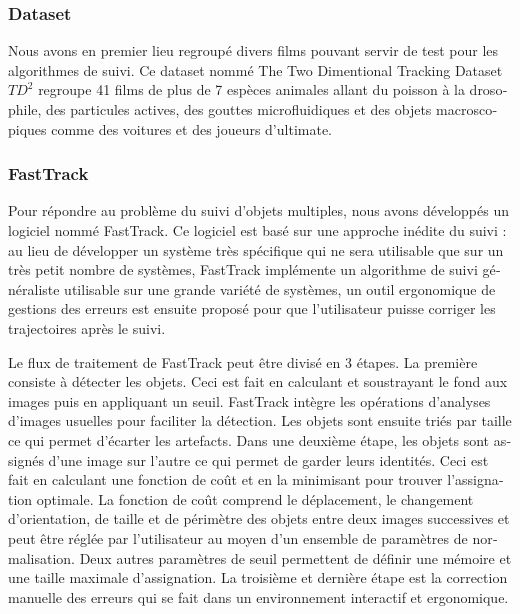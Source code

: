 \begin{otherlanguage}{french}
\subsubsection*{Dataset}
Nous avons en premier lieu regroupé divers films pouvant servir de test pour les algorithmes de suivi. Ce dataset nommé The Two Dimentional Tracking Dataset $TD^2$ regroupe 41 films de plus de 7 espèces animales allant du poisson à la drosophile, des particules actives, des gouttes microfluidiques et des objets macroscopiques comme des voitures et des joueurs d'ultimate.

\subsubsection*{FastTrack}
Pour répondre au problème du suivi d'objets multiples, nous avons développés un logiciel nommé FastTrack. Ce logiciel est basé sur une approche inédite du suivi : au lieu de développer un système très spécifique qui ne sera utilisable que sur un très petit nombre de systèmes, FastTrack implémente un algorithme de suivi généraliste utilisable sur une grande variété de systèmes, un outil ergonomique de gestions des erreurs est ensuite proposé pour que l'utilisateur puisse corriger les trajectoires après le suivi.

Le flux de traitement de FastTrack peut être divisé en 3 étapes. La première consiste à détecter les objets. Ceci est fait en calculant et soustrayant le fond aux images puis en appliquant un seuil. FastTrack intègre les opérations d'analyses d'images usuelles pour faciliter la détection. Les objets sont ensuite triés par taille ce qui permet d'écarter les artefacts. Dans une deuxième étape, les objets sont assignés d'une image sur l'autre ce qui permet de garder leurs identités. Ceci est fait en calculant une fonction de coût et en la minimisant pour trouver l'assignation optimale. La fonction de coût comprend le déplacement, le changement d'orientation, de taille et de périmètre des objets entre deux images successives et peut être réglée par l'utilisateur au moyen d'un ensemble de paramètres de normalisation. Deux autres paramètres de seuil permettent de définir une mémoire et une taille maximale d'assignation. La troisième et dernière étape est la correction manuelle des erreurs qui se fait dans un environnement interactif et ergonomique.


\end{otherlanguage}
